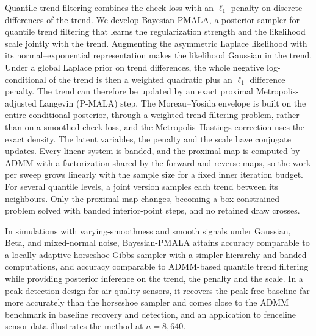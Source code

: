 Quantile trend filtering combines the check loss with an $\ell_1$ penalty on discrete differences of the trend. We develop Bayesian-PMALA, a posterior sampler for quantile trend filtering that learns the regularization strength and the likelihood scale jointly with the trend. Augmenting the asymmetric Laplace likelihood with its normal--exponential representation makes the likelihood Gaussian in the trend. Under a global Laplace prior on trend differences, the whole negative log-conditional of the trend is then a weighted quadratic plus an $\ell_1$ difference penalty. The trend can therefore be updated by an exact proximal Metropolis-adjusted Langevin (P-MALA) step. The Moreau--Yosida envelope is built on the entire conditional posterior, through a weighted trend filtering problem, rather than on a smoothed check loss, and the Metropolis--Hastings correction uses the exact density. The latent variables, the penalty and the scale have conjugate updates. Every linear system is banded, and the proximal map is computed by ADMM with a factorization shared by the forward and reverse maps, so the work per sweep grows linearly with the sample size for a fixed inner iteration budget. For several quantile levels, a joint version samples each trend between its neighbours. Only the proximal map changes, becoming a box-constrained problem solved with banded interior-point steps, and no retained draw crosses.

In simulations with varying-smoothness and smooth signals under Gaussian, Beta, and mixed-normal noise, Bayesian-PMALA attains accuracy comparable to a locally adaptive horseshoe Gibbs sampler with a simpler hierarchy and banded computations, and accuracy comparable to ADMM-based quantile trend filtering while providing posterior inference on the trend, the penalty and the scale. In a peak-detection design for air-quality sensors, it recovers the peak-free baseline far more accurately than the horseshoe sampler and comes close to the ADMM benchmark in baseline recovery and detection, and an application to fenceline sensor data illustrates the method at $n = 8{,}640$.

